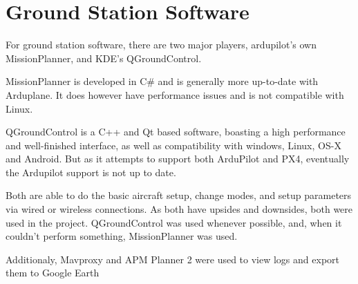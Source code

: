 \section{Ground Station Software}

For ground station software, there are two major players, ardupilot's own MissionPlanner, and KDE's QGroundControl.

MissionPlanner is developed in C\# and is generally more up-to-date with Arduplane.
%
It does however have performance issues and is not compatible with Linux.
%

QGroundControl is a C++ and Qt based software, boasting a high performance and well-finished interface, as well as compatibility with windows, Linux, OS-X and Android. But as it attempts to support both ArduPilot and PX4, eventually the Ardupilot support is not up to date.
%

Both are able to do the basic aircraft setup, change modes, and setup parameters via wired or wireless connections. As both have upsides and downsides, both were used in the project. QGroundControl was used whenever possible, and, when it couldn't perform something, MissionPlanner was used.

Additionaly, Mavproxy\cite{mavproxy} and APM Planner 2\cite{apm2} were used to view logs and export them to Google Earth

